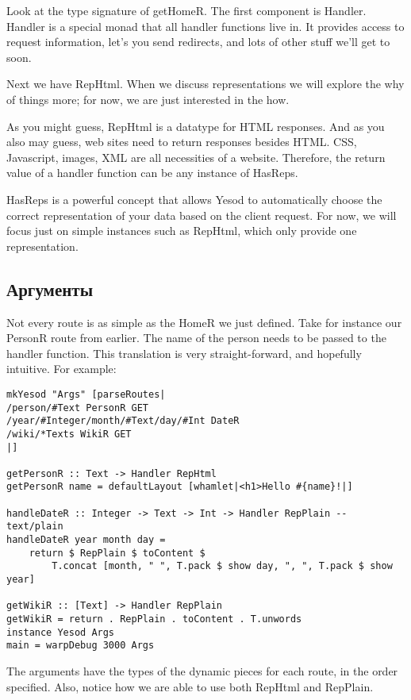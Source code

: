 Look at the type signature of getHomeR. The first component is
Handler. Handler is a special monad that all handler functions live
in. It provides access to request information, let's you send
redirects, and lots of other stuff we'll get to soon.

Next we have RepHtml. When we discuss representations we will explore
the why of things more; for now, we are just interested in the how.

As you might guess, RepHtml is a datatype for HTML responses. And as
you also may guess, web sites need to return responses besides
HTML. CSS, Javascript, images, XML are all necessities of a
website. Therefore, the return value of a handler function can be any
instance of HasReps.

HasReps is a powerful concept that allows Yesod to automatically
choose the correct representation of your data based on the client
request. For now, we will focus just on simple instances such as
RepHtml, which only provide one representation.

\subsection{Аргументы}

Not every route is as simple as the HomeR we just defined. Take for
instance our PersonR route from earlier. The name of the person needs
to be passed to the handler function. This translation is very
straight-forward, and hopefully intuitive. For example:

\begin{lstlisting}
mkYesod "Args" [parseRoutes|
/person/#Text PersonR GET
/year/#Integer/month/#Text/day/#Int DateR
/wiki/*Texts WikiR GET
|]

getPersonR :: Text -> Handler RepHtml
getPersonR name = defaultLayout [whamlet|<h1>Hello #{name}!|]

handleDateR :: Integer -> Text -> Int -> Handler RepPlain -- text/plain
handleDateR year month day =
    return $ RepPlain $ toContent $
        T.concat [month, " ", T.pack $ show day, ", ", T.pack $ show year]

getWikiR :: [Text] -> Handler RepPlain
getWikiR = return . RepPlain . toContent . T.unwords
instance Yesod Args
main = warpDebug 3000 Args
\end{lstlisting}

The arguments have the types of the dynamic pieces for each route, in
the order specified. Also, notice how we are able to use both RepHtml
and RepPlain.

